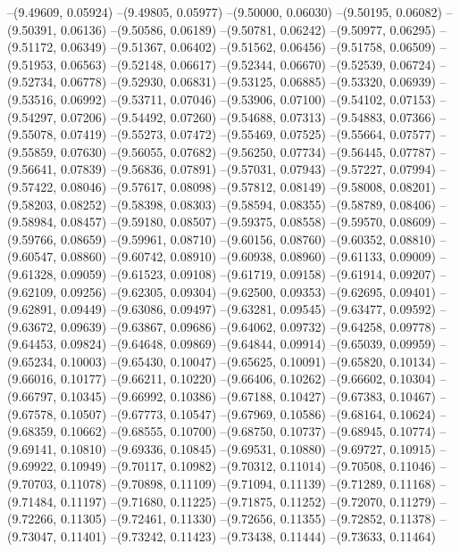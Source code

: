 --(9.49609, 0.05924)
--(9.49805, 0.05977)
--(9.50000, 0.06030)
--(9.50195, 0.06082)
--(9.50391, 0.06136)
--(9.50586, 0.06189)
--(9.50781, 0.06242)
--(9.50977, 0.06295)
--(9.51172, 0.06349)
--(9.51367, 0.06402)
--(9.51562, 0.06456)
--(9.51758, 0.06509)
--(9.51953, 0.06563)
--(9.52148, 0.06617)
--(9.52344, 0.06670)
--(9.52539, 0.06724)
--(9.52734, 0.06778)
--(9.52930, 0.06831)
--(9.53125, 0.06885)
--(9.53320, 0.06939)
--(9.53516, 0.06992)
--(9.53711, 0.07046)
--(9.53906, 0.07100)
--(9.54102, 0.07153)
--(9.54297, 0.07206)
--(9.54492, 0.07260)
--(9.54688, 0.07313)
--(9.54883, 0.07366)
--(9.55078, 0.07419)
--(9.55273, 0.07472)
--(9.55469, 0.07525)
--(9.55664, 0.07577)
--(9.55859, 0.07630)
--(9.56055, 0.07682)
--(9.56250, 0.07734)
--(9.56445, 0.07787)
--(9.56641, 0.07839)
--(9.56836, 0.07891)
--(9.57031, 0.07943)
--(9.57227, 0.07994)
--(9.57422, 0.08046)
--(9.57617, 0.08098)
--(9.57812, 0.08149)
--(9.58008, 0.08201)
--(9.58203, 0.08252)
--(9.58398, 0.08303)
--(9.58594, 0.08355)
--(9.58789, 0.08406)
--(9.58984, 0.08457)
--(9.59180, 0.08507)
--(9.59375, 0.08558)
--(9.59570, 0.08609)
--(9.59766, 0.08659)
--(9.59961, 0.08710)
--(9.60156, 0.08760)
--(9.60352, 0.08810)
--(9.60547, 0.08860)
--(9.60742, 0.08910)
--(9.60938, 0.08960)
--(9.61133, 0.09009)
--(9.61328, 0.09059)
--(9.61523, 0.09108)
--(9.61719, 0.09158)
--(9.61914, 0.09207)
--(9.62109, 0.09256)
--(9.62305, 0.09304)
--(9.62500, 0.09353)
--(9.62695, 0.09401)
--(9.62891, 0.09449)
--(9.63086, 0.09497)
--(9.63281, 0.09545)
--(9.63477, 0.09592)
--(9.63672, 0.09639)
--(9.63867, 0.09686)
--(9.64062, 0.09732)
--(9.64258, 0.09778)
--(9.64453, 0.09824)
--(9.64648, 0.09869)
--(9.64844, 0.09914)
--(9.65039, 0.09959)
--(9.65234, 0.10003)
--(9.65430, 0.10047)
--(9.65625, 0.10091)
--(9.65820, 0.10134)
--(9.66016, 0.10177)
--(9.66211, 0.10220)
--(9.66406, 0.10262)
--(9.66602, 0.10304)
--(9.66797, 0.10345)
--(9.66992, 0.10386)
--(9.67188, 0.10427)
--(9.67383, 0.10467)
--(9.67578, 0.10507)
--(9.67773, 0.10547)
--(9.67969, 0.10586)
--(9.68164, 0.10624)
--(9.68359, 0.10662)
--(9.68555, 0.10700)
--(9.68750, 0.10737)
--(9.68945, 0.10774)
--(9.69141, 0.10810)
--(9.69336, 0.10845)
--(9.69531, 0.10880)
--(9.69727, 0.10915)
--(9.69922, 0.10949)
--(9.70117, 0.10982)
--(9.70312, 0.11014)
--(9.70508, 0.11046)
--(9.70703, 0.11078)
--(9.70898, 0.11109)
--(9.71094, 0.11139)
--(9.71289, 0.11168)
--(9.71484, 0.11197)
--(9.71680, 0.11225)
--(9.71875, 0.11252)
--(9.72070, 0.11279)
--(9.72266, 0.11305)
--(9.72461, 0.11330)
--(9.72656, 0.11355)
--(9.72852, 0.11378)
--(9.73047, 0.11401)
--(9.73242, 0.11423)
--(9.73438, 0.11444)
--(9.73633, 0.11464)
